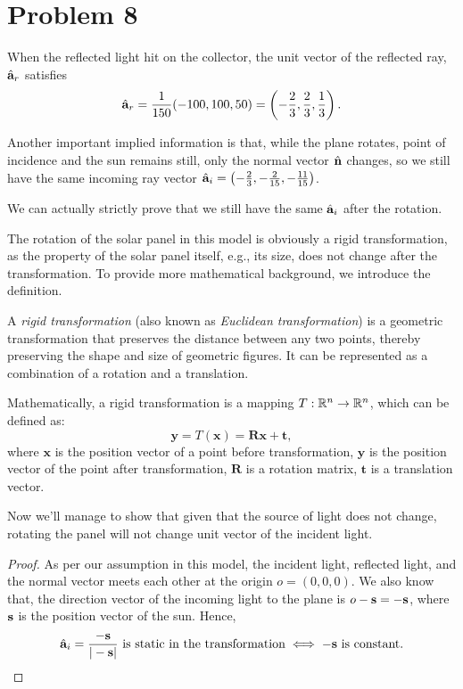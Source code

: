 \documentclass[12pt,a4paper]{article}
\begin{document}
\section*{Problem 8}
\begin{solution}
When the reflected light hit on the collector, the unit vector of the reflected ray, $\hat{\mathbf{a}}_r$ satisfies
$$\hat{\mathbf{a}}_r =\frac{1}{150}(-100,100,50) = \left(-\frac{2}{3}, \frac{2}{3}, \frac{1}{3} \right).$$

Another important implied information is that, while the plane rotates, point of incidence and the sun remains still, only the normal vector $\hat{\mathbf{n}}$ changes, so we still have the same incoming ray vector $\hat{\mathbf{a}}_i = \left( -\frac{2}{3}, -\frac{2}{15}, -\frac{11}{15} \right)$.
\begin{remark}
We can actually strictly prove that we still have the same $\hat{\mathbf{a}}_i$ after the rotation.

The rotation of the solar panel in this model is obviously a rigid transformation, as the property of the solar panel itself, e.g., its size, does not change after the transformation. To provide more mathematical background, we introduce the definition.
\begin{definition}
A \emph{rigid transformation} (also known as \textit{Euclidean transformation}) is a geometric transformation that preserves the distance between any two points, thereby preserving the shape and size of geometric figures. It can be represented as a combination of a rotation and a translation.

Mathematically, a rigid transformation is a mapping \( T: \mathbb{R}^n \to \mathbb{R}^n \), which can be defined as:
$$
\mathbf{y} = T(\mathbf{x}) = \mathbf{R}\mathbf{x} + \mathbf{t},
$$
where
\(\mathbf{x}\) is the position vector of a point before transformation,
\(\mathbf{y}\) is the position vector of the point after transformation,
\(\mathbf{R}\) is a rotation matrix,
\(\mathbf{t}\) is a translation vector.

\end{definition}

Now we'll manage to show that given that the source of light does not change, rotating the panel will not change unit vector of the incident light.
\begin{proof}
    As per our assumption in this model, the incident light, reflected light, and the normal vector meets each other at the origin $o=(0,0,0)$. We also know that, the direction vector of the incoming light to the plane is $o - \mathbf{s} = -\mathbf{s}$, where $\mathbf{s}$ is the position vector of the sun. Hence, 
    $$\hat{\mathbf{a}}_i = \frac{-\mathbf{s}}{|-\mathbf{s}|} \text{ is static in the transformation}\iff -\mathbf{s} \text{ is constant.}$$


\end{proof}
\end{remark}
\end{solution}
\end{document}
